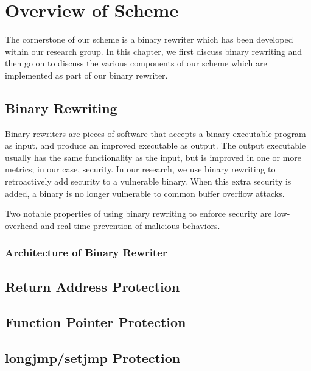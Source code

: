 
\renewcommand{\thechapter}{3}

\chapter{Overview of Scheme}

The cornerstone of our scheme is a binary rewriter which has been developed within our research
group. In this chapter, we first discuss binary rewriting and then go on to discuss the various
components of our scheme which are implemented as part of our binary rewriter.

\section{Binary Rewriting}

Binary rewriters are pieces of software that accepts a binary executable program as input, and
produce an improved executable as output. The output executable usually has the same functionality
as the input, but is improved in one or more metrics; in our case, security. In our research, we use
binary rewriting to retroactively add security to a vulnerable binary. When this extra security is
added, a binary is no longer vulnerable to common buffer overflow attacks.

Two notable properties of using binary rewriting to enforce security are low-overhead and real-time
prevention of malicious behaviors. 

\subsection{Architecture of Binary Rewriter}

\section{Return Address Protection}

\section{Function Pointer Protection}

\section{longjmp/setjmp Protection}
